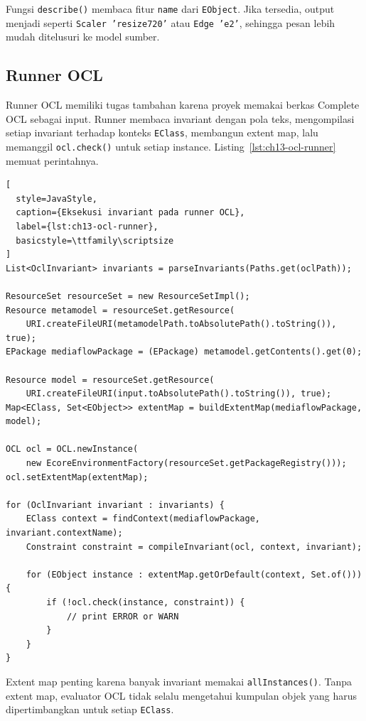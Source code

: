 \noindent Fungsi \texttt{describe()} membaca fitur \texttt{name} dari \texttt{EObject}. Jika tersedia, output menjadi seperti \texttt{Scaler 'resize720'} atau \texttt{Edge 'e2'}, sehingga pesan lebih mudah ditelusuri ke model sumber.

\subsection{Runner OCL}

Runner OCL memiliki tugas tambahan karena proyek memakai berkas Complete OCL sebagai input. Runner membaca invariant dengan pola teks, mengompilasi setiap invariant terhadap konteks \texttt{EClass}, membangun extent map, lalu memanggil \texttt{ocl.check()} untuk setiap instance. Listing~\ref{lst:ch13-ocl-runner} memuat perintahnya.

\begin{lstlisting}[
  style=JavaStyle,
  caption={Eksekusi invariant pada runner OCL},
  label={lst:ch13-ocl-runner},
  basicstyle=\ttfamily\scriptsize
]
List<OclInvariant> invariants = parseInvariants(Paths.get(oclPath));

ResourceSet resourceSet = new ResourceSetImpl();
Resource metamodel = resourceSet.getResource(
    URI.createFileURI(metamodelPath.toAbsolutePath().toString()), true);
EPackage mediaflowPackage = (EPackage) metamodel.getContents().get(0);

Resource model = resourceSet.getResource(
    URI.createFileURI(input.toAbsolutePath().toString()), true);
Map<EClass, Set<EObject>> extentMap = buildExtentMap(mediaflowPackage, model);

OCL ocl = OCL.newInstance(
    new EcoreEnvironmentFactory(resourceSet.getPackageRegistry()));
ocl.setExtentMap(extentMap);

for (OclInvariant invariant : invariants) {
    EClass context = findContext(mediaflowPackage, invariant.contextName);
    Constraint constraint = compileInvariant(ocl, context, invariant);

    for (EObject instance : extentMap.getOrDefault(context, Set.of())) {
        if (!ocl.check(instance, constraint)) {
            // print ERROR or WARN
        }
    }
}
\end{lstlisting}

\noindent Extent map penting karena banyak invariant memakai \texttt{allInstances()}. Tanpa extent map, evaluator OCL tidak selalu mengetahui kumpulan objek yang harus dipertimbangkan untuk setiap \texttt{EClass}.

